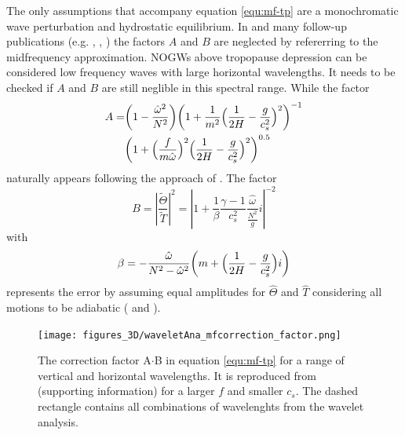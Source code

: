 The only assumptions that accompany equation \ref{equ:mf-tp} are a monochromatic wave perturbation and hydrostatic equilibrium. In \textcite[]{ern_absolute_2004} and many follow-up publications (e.g. \cite[]{preusse_characteristics_2014}, \cite[]{ern_gracile_2018}, \cite[]{hindley_gravity_2019}) the factors $A$ and $B$ are neglected by refererring to the midfrequency approximation. NOGWs above tropopause depression can be considered low frequency waves with large horizontal wavelengths. It needs to be checked if $A$ and $B$ are still neglible in this spectral range. While the factor
\begin{equation}
    \begin{split}
        A = &\biggl(1-\frac{\hat{\omega}^2}{N^2}\biggr) \biggl(1 + \frac{1}{m^2} \Bigl(\frac{1}{2H}-\frac{g}{c_s^2}\Bigr)^2\biggr)^{-1} \\
            &\biggl(1+\Bigl(\frac{f}{m \hat{\omega}}\Bigr)^2 \Bigl(\frac{1}{2H} - \frac{g}{c_s^2}\Bigr)^2\biggr)^{0.5}
    \end{split}
    \label{equ:A}
\end{equation}
naturally appears following the approach of \textcite[]{ern_absolute_2004}. The factor
\begin{equation}
    B = \left| \frac{\tilde{\Theta}}{\tilde{T}} \right|^2 = \left| 1 + \frac{1}{\beta} \frac{\gamma-1}{c_s^2} \frac{\hat{\omega}}{\frac{N^2}{g}}i\right|^{-2}
    \label{equ:B}
\end{equation}
with
\begin{equation}
    \beta = -\frac{\hat{\omega}}{N^2-\hat{\omega}^2} \biggl(m + \Bigl(\frac{1}{2H}-\frac{g}{c_s^2}\Bigr)i\biggr)
    \label{equ:beta}
\end{equation}
represents the error by assuming equal amplitudes for $\hat{\Theta}$ and $\hat{T}$ considering all motions to be adiabatic (\cite[]{fritts_gravity_2003} and \cite[]{ern_directional_2017}).
\begin{figure}
    \texttt{[image: figures\_3D/waveletAna\_mfcorrection\_factor.png]}
    \caption{The correction factor A$\cdot$B in equation \ref{equ:mf-tp} for a range of vertical and horizontal wavelengths. It is reproduced from \textcite[]{ern_directional_2017} (supporting information) for a larger $f$ and smaller $c_s$. The dashed rectangle contains all combinations of wavelenghts from the wavelet analysis.}
    \label{fig:mf_correction}
\end{figure}
